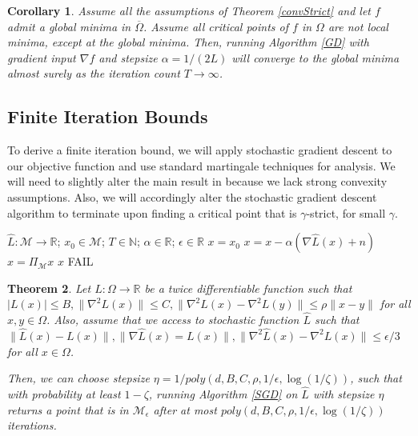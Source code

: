 \documentclass{article}
\newtheorem{theorem}{Theorem}[section]
\newtheorem{corollary}[theorem]{Corollary}
\newcommand{\N}{{\mathbb{N}}}
\newcommand{\R}{{\mathbb{R}}}
\begin{document}
\begin{corollary}
Assume all the assumptions of Theorem \ref{convStrict} and let $f$ admit a global minima in $\overline{\Omega}$. Assume all critical points of $f$ in $\Omega$ are not local minima, except at the global minima. Then, running Algorithm \ref{GD} with gradient input $\nabla f$ and stepsize $\alpha = 1/(2L)$ will converge to the global minima almost surely as the iteration count $T \to\infty$.
\end{corollary}

\subsection{Finite Iteration Bounds} 

To derive a finite iteration bound, we will apply stochastic gradient descent to our objective function and use standard martingale techniques for analysis. We will need to slightly alter the main result in \cite{GeHJY15} because we lack strong convexity assumptions. Also, we will accordingly alter the stochastic gradient descent algorithm to terminate upon finding a critical point that is $\gamma$-strict, for small $\gamma$.

\begin{algorithm}[hb]
 \caption{$x = SGD(\widehat{L}, x_0, T,\alpha,\epsilon)$}
   \label{SGD}
\begin{algorithmic}
    $\widehat{L}:\mathcal{M} \to \R$; $x_0 \in \mathcal{M}$; $T\in \N$; $\alpha \in \R$; $\epsilon\in\R$
   \vspace{.1in}
    $x = x_0$
   \STATE $x = x - \alpha(\nabla \widehat{L} (x)+n)$
   \STATE $x = \Pi_\mathcal{M} x$
    $x$
   \ENDIF
   \ENDFOR
    FAIL
\end{algorithmic}
\end{algorithm}





\begin{theorem}\label{strongConverge}
Let $L :\Omega \to \R$ be a twice differentiable function such that $|L(x)| \leq B, \|\nabla^2 L(x)\| \leq C,\|\nabla^2L(x) -\nabla^2L(y)\| \leq \rho\|x - y\|$ for all $x,y\in\Omega$. Also, assume that we access to stochastic function $\widehat{L}$ such that $\|\widehat{L}(x) -L(x)\|, \|\nabla \widehat{L}(x) = L(x)\|, \|\nabla^2\widehat{L}(x) -\nabla^2 L(x)\| \leq \epsilon/3$ for all $x\in \Omega$.

Then, we can choose stepsize $\eta = 1/poly(d,B,C,\rho,1/\epsilon,\log(1/\zeta))$, such that with probability at least $1-\zeta$, running Algorithm \ref{SGD} on $\widehat{L}$ with stepsize $\eta$  returns a point that is in $\mathcal{M}_\epsilon$ after at most $poly(d,B,C,\rho,1/\epsilon, \log(1/\zeta))$ iterations.
\end{theorem}
\end{document}

